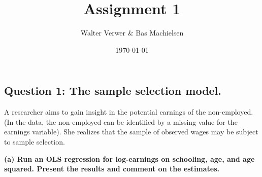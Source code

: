 \documentclass[
]{article}
\title{Assignment 1}
\author{Walter Verwer \& Bas Machielsen}
\date{\today}
\newenvironment{Shaded}{\begin{snugshade}}{\end{snugshade}}
\newcommand{\DataTypeTok}[1]{\textcolor[rgb]{0.13,0.29,0.53}{#1}}
\newcommand{\DecValTok}[1]{\textcolor[rgb]{0.00,0.00,0.81}{#1}}
\newcommand{\KeywordTok}[1]{\textcolor[rgb]{0.13,0.29,0.53}{\textbf{#1}}}
\newcommand{\NormalTok}[1]{#1}
\newcommand{\OperatorTok}[1]{\textcolor[rgb]{0.81,0.36,0.00}{\textbf{#1}}}
\newcommand{\StringTok}[1]{\textcolor[rgb]{0.31,0.60,0.02}{#1}}
\begin{document}
\maketitle

\hypertarget{question-1-the-sample-selection-model.}{%
\subsection{Question 1: The sample selection
model.}\label{question-1-the-sample-selection-model.}}

A researcher aims to gain insight in the potential earnings of the
non-employed. (In the data, the non-employed can be identified by a
missing value for the earnings variable). She realizes that the sample
of observed wages may be subject to sample selection.

\textbf{(a) Run an OLS regression for log-earnings on schooling, age,
and age squared. Present the results and comment on the estimates.}

\begin{Shaded}
\end{Shaded}
\end{document}
